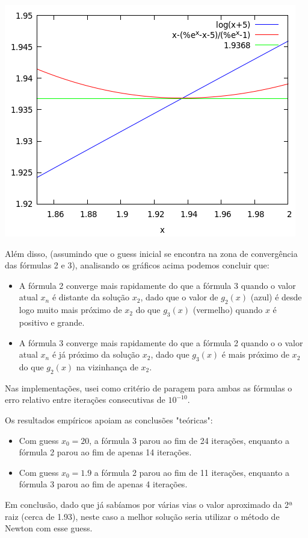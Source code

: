 {\begin{center}
\includegraphics[scale=0.45]{2017E_3_3_03}
\end{center}
Além disso, (assumindo que o guess inicial se encontra na zona de convergência das fórmulas 2 e 3), analisando os gráficos acima podemos concluir que:
\begin{itemize}
    \item A fórmula 2 converge mais rapidamente do que a fórmula 3 quando o valor atual $x_n$ é distante da solução $x_2$, dado que o valor de $g_2(x)$ (azul) é desde logo muito mais próximo de $x_2$ do que $g_3(x)$ (vermelho) quando $x$ é positivo e grande.
    \item A fórmula 3 converge mais rapidamente do que a fórmula 2 quando o o valor atual $x_n$ é já próximo da solução $x_2$, dado que $g_3(x)$ é mais próximo de $x_2$ do que $g_2(x)$ na vizinhança de $x_2$.
\end{itemize}
Nas implementações, usei como critério de paragem para ambas as fórmulas o erro relativo entre iterações consecutivas de $10^{-10}$.

Os resultados empíricos apoiam as conclusões "teóricas":
\begin{itemize}
    \item Com guess $x_0=20$, a fórmula 3 parou ao fim de 24 iterações, enquanto a fórmula 2 parou ao fim de apenas 14 iterações.
    \item Com guess $x_0=1.9$ a fórmula 2 parou ao fim de 11 iterações, enquanto a fórmula 3 parou ao fim de apenas 4 iterações.
\end{itemize}
Em conclusão, dado que já sabíamos por várias vias o valor aproximado da 2ª raiz (cerca de 1.93), neste caso a melhor solução seria utilizar o método de Newton com esse guess.

}
